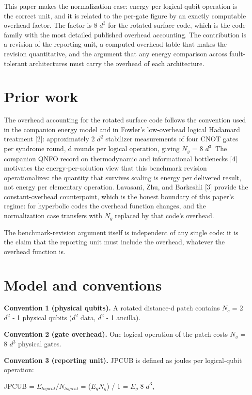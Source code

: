 \documentclass[11pt]{article}
\begin{document}
This paper makes the normalization case: energy per logical-qubit operation is the correct unit, and it is related to the per-gate figure by an exactly computable overhead factor. The factor is 8 $d^{3}$ for the rotated surface code, which is the code family with the most detailed published overhead accounting. The contribution is a revision of the reporting unit, a computed overhead table that makes the revision quantitative, and the argument that any energy comparison across fault-tolerant architectures must carry the overhead of each architecture.

\section{Prior work}
The overhead accounting for the rotated surface code follows the convention used in the companion energy model and in Fowler's low-overhead logical Hadamard treatment [2]: approximately 2 $d^{2}$ stabilizer measurements of four CNOT gates per syndrome round, d rounds per logical operation, giving $N_{g}$ = 8 $d^{3.}$ The companion QNFO record on thermodynamic and informational bottlenecks [4] motivates the energy-per-solution view that this benchmark revision operationalizes: the quantity that survives scaling is energy per delivered result, not energy per elementary operation. Lavasani, Zhu, and Barkeshli [3] provide the constant-overhead counterpoint, which is the honest boundary of this paper's regime: for hyperbolic codes the overhead function changes, and the normalization case transfers with $N_{g}$ replaced by that code's overhead.

The benchmark-revision argument itself is independent of any single code: it is the claim that the reporting unit must include the overhead, whatever the overhead function is.

\section{Model and conventions}
\textbf{Convention 1 (physical qubits).} A rotated distance-d patch contains $N_{c}$ = 2 $d^{2}$ - 1 physical qubits ($d^{2}$ data, $d^{2}$ - 1 ancilla).

\textbf{Convention 2 (gate overhead).} One logical operation of the patch costs $N_{g}$ = 8 $d^{3}$ physical gates.

\textbf{Convention 3 (reporting unit).} JPCUB is defined as joules per logical-qubit operation:

JPCUB = $E_{logical} / N_{logical}$ = ($E_{g}   N_{g}$) / 1 = $E_{g}$ 8 $d^{3}$,
\end{document}
